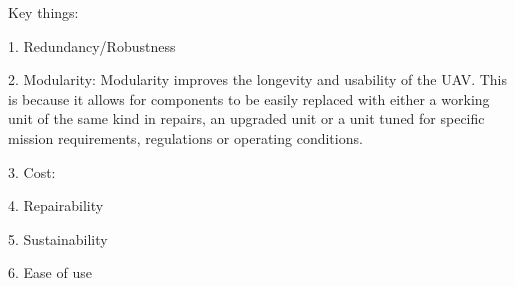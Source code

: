 Key things:

1. Redundancy/Robustness

2. Modularity: Modularity improves the longevity and usability of the \gls{UAV}. This is because it allows for components to be easily replaced with either a working unit of the same kind in repairs, an upgraded unit or a unit tuned for specific mission requirements, regulations or operating conditions. 

3. Cost: 

4. Repairability

5. Sustainability

6. Ease of use
